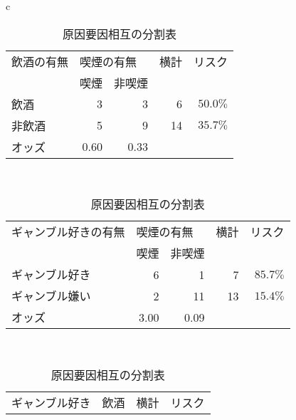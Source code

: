 \documentclass{ltjsarticle}
\begin{document}
\begin{table}[b]
    \caption{原因要因相互の分割表}
    \label{tbl:score_4}
    \centering
    \begin{tabular}{c}
        \begin{minipage}{0.4\hsize}
            \centering
            \begin{tabular}{l|r|r|r|r} \hline 
                \multicolumn{1}{l}{飲酒の有無} & \multicolumn{2}{|l|}{喫煙の有無} & \multicolumn{1}{l|}{横計} & \multicolumn{1}{l}{リスク}\\ \cline{2-3}
                & 喫煙 & 非喫煙 & & \\ \hline \hline
                飲酒 & 3 & 3 & 6 & $50.0\%$ \\
                非飲酒 & 5 & 9 & 14 & $35.7\%$ \\ \hline 
                オッズ & 0.60 & 0.33 & \multicolumn{2}{|l}{} \\ \hline
            \end{tabular}
        \end{minipage} \\
        \begin{minipage}{0.4\hsize}
            \centering
            \begin{tabular}{l|r|r|r|r} \hline 
                \multicolumn{1}{l}{ギャンブル好きの有無} & \multicolumn{2}{|l|}{喫煙の有無} & \multicolumn{1}{l|}{横計} & \multicolumn{1}{l}{リスク}\\ \cline{2-3}
                & 喫煙 & 非喫煙 & & \\ \hline \hline
                ギャンブル好き & 6 & 1 & 7 & $85.7\%$ \\
                ギャンブル嫌い & 2 & 11 & 13 & $15.4\%$ \\ \hline 
                オッズ & 3.00 & 0.09 & \multicolumn{2}{|l}{} \\ \hline
            \end{tabular}
        \end{minipage} \\
        \begin{minipage}{0.4\hsize}
            \centering
            \begin{tabular}{l|r|r|r|r} \hline 
                \multicolumn{1}{l}{ギャンブル好き} & \multicolumn{2}{|l|}{飲酒} & \multicolumn{1}{l|}{横計} & \multicolumn{1}{l}{リスク}\\ \cline{2-3}

\end{tabular}
\end{minipage}
\end{tabular}
\end{table}
\end{document}
